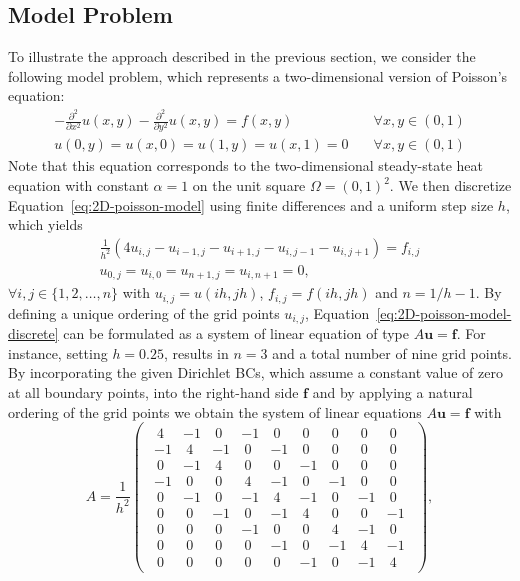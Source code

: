 \subsection{Model Problem}
To illustrate the approach described in the previous section, we consider the following model problem, which represents a two-dimensional version of Poisson's equation:
\begin{equation}
	\begin{split}
		-\frac{\partial^2}{\partial x^2} u(x,y) - \frac{\partial^2}{\partial y^2} u(x,y) = f(x, y) \quad & \forall x, y \in (0, 1) \\
		u(0, y) = u(x, 0) = u(1, y) = u(x, 1) = 0 \quad & \forall x, y \in (0, 1)
	\end{split}
	\label{eq:2D-poisson-model}
\end{equation}
Note that this equation corresponds to the two-dimensional steady-state heat equation with constant $\alpha = 1$ on the unit square $\Omega = ( 0, 1 )^2$.
We then discretize Equation~\eqref{eq:2D-poisson-model} using finite differences and a uniform step size $h$, which yields
\begin{equation}
	\begin{aligned}
		\frac{1}{h^2} (4 u_{i,j} - u_{i-1, j} - u_{i+1, j} - u_{i, j-1} - u_{i, j+1}) = f_{i, j} \\
		u_{0, j} = u_{i, 0} = u_{n+1, j} = u_{i, n+1} = 0,
	\end{aligned} 
	\label{eq:2D-poisson-model-discrete}
\end{equation}
$\forall i, j \in \{1, 2, \dots, n\}$ with $u_{i,j} = u(ih, jh)$, $f_{i,j} = f(ih, jh)$ and $n = 1/h - 1$.
By defining a unique ordering of the grid points $u_{i, j}$, Equation~\eqref{eq:2D-poisson-model-discrete} can be formulated as a system of linear equation of type $A \bm{u} = \bm{f}$. 
For instance, setting $h = 0.25$, results in $n = 3$ and a total number of nine grid points.
By incorporating the given Dirichlet BCs, which assume a constant value of zero at all boundary points, into the right-hand side $\bm{f}$ and by applying a natural ordering of the grid points we obtain the system of linear equations $A \bm{u} = \bm{f}$ with
\begin{equation}
A = \frac{1}{h^2} \begin{pmatrix}
\begin{array}{ccc|ccc|ccc}~4&-1&~0&-1&~0&~0&~0&~0&~0\\-1&~4&-1&~0&-1&~0&~0&~0&~0\\~0&-1&~4&~0&~0&-1&~0&~0&~0\\\hline -1&~0&~0&~4&-1&~0&-1&~0&~0\\~0&-1&~0&-1&~4&-1&~0&-1&~0\\~0&~0&-1&~0&-1&~4&~0&~0&-1\\\hline ~0&~0&~0&-1&~0&~0&~4&-1&~0\\~0&~0&~0&~0&-1&~0&-1&~4&-1\\~0&~0&~0&~0&~0&-1&~0&-1&~4\end{array}
	\end{pmatrix},
\label{eq:2D-poisson-assembled-matrix}
\end{equation}
